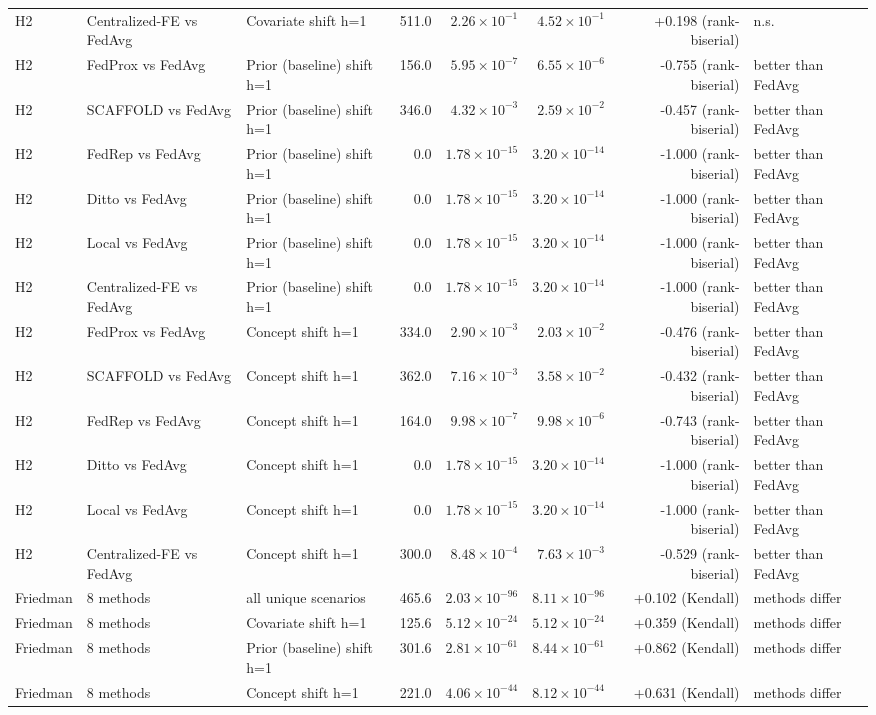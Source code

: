 \begin{tabular}{lllrrrrl}
H2 & Centralized-FE vs FedAvg & Covariate shift h=1 & 511.0 & $2.26\times10^{-1}$ & $4.52\times10^{-1}$ & +0.198 (rank-biserial) & n.s. \\
H2 & FedProx vs FedAvg & Prior (baseline) shift h=1 & 156.0 & $5.95\times10^{-7}$ & $6.55\times10^{-6}$ & -0.755 (rank-biserial) & better than FedAvg \\
H2 & SCAFFOLD vs FedAvg & Prior (baseline) shift h=1 & 346.0 & $4.32\times10^{-3}$ & $2.59\times10^{-2}$ & -0.457 (rank-biserial) & better than FedAvg \\
H2 & FedRep vs FedAvg & Prior (baseline) shift h=1 & 0.0 & $1.78\times10^{-15}$ & $3.20\times10^{-14}$ & -1.000 (rank-biserial) & better than FedAvg \\
H2 & Ditto vs FedAvg & Prior (baseline) shift h=1 & 0.0 & $1.78\times10^{-15}$ & $3.20\times10^{-14}$ & -1.000 (rank-biserial) & better than FedAvg \\
H2 & Local vs FedAvg & Prior (baseline) shift h=1 & 0.0 & $1.78\times10^{-15}$ & $3.20\times10^{-14}$ & -1.000 (rank-biserial) & better than FedAvg \\
H2 & Centralized-FE vs FedAvg & Prior (baseline) shift h=1 & 0.0 & $1.78\times10^{-15}$ & $3.20\times10^{-14}$ & -1.000 (rank-biserial) & better than FedAvg \\
H2 & FedProx vs FedAvg & Concept shift h=1 & 334.0 & $2.90\times10^{-3}$ & $2.03\times10^{-2}$ & -0.476 (rank-biserial) & better than FedAvg \\
H2 & SCAFFOLD vs FedAvg & Concept shift h=1 & 362.0 & $7.16\times10^{-3}$ & $3.58\times10^{-2}$ & -0.432 (rank-biserial) & better than FedAvg \\
H2 & FedRep vs FedAvg & Concept shift h=1 & 164.0 & $9.98\times10^{-7}$ & $9.98\times10^{-6}$ & -0.743 (rank-biserial) & better than FedAvg \\
H2 & Ditto vs FedAvg & Concept shift h=1 & 0.0 & $1.78\times10^{-15}$ & $3.20\times10^{-14}$ & -1.000 (rank-biserial) & better than FedAvg \\
H2 & Local vs FedAvg & Concept shift h=1 & 0.0 & $1.78\times10^{-15}$ & $3.20\times10^{-14}$ & -1.000 (rank-biserial) & better than FedAvg \\
H2 & Centralized-FE vs FedAvg & Concept shift h=1 & 300.0 & $8.48\times10^{-4}$ & $7.63\times10^{-3}$ & -0.529 (rank-biserial) & better than FedAvg \\
Friedman & 8 methods & all unique scenarios & 465.6 & $2.03\times10^{-96}$ & $8.11\times10^{-96}$ & +0.102 (Kendall) & methods differ \\
Friedman & 8 methods & Covariate shift h=1 & 125.6 & $5.12\times10^{-24}$ & $5.12\times10^{-24}$ & +0.359 (Kendall) & methods differ \\
Friedman & 8 methods & Prior (baseline) shift h=1 & 301.6 & $2.81\times10^{-61}$ & $8.44\times10^{-61}$ & +0.862 (Kendall) & methods differ \\
Friedman & 8 methods & Concept shift h=1 & 221.0 & $4.06\times10^{-44}$ & $8.12\times10^{-44}$ & +0.631 (Kendall) & methods differ \\
\bottomrule
\end{tabular}
